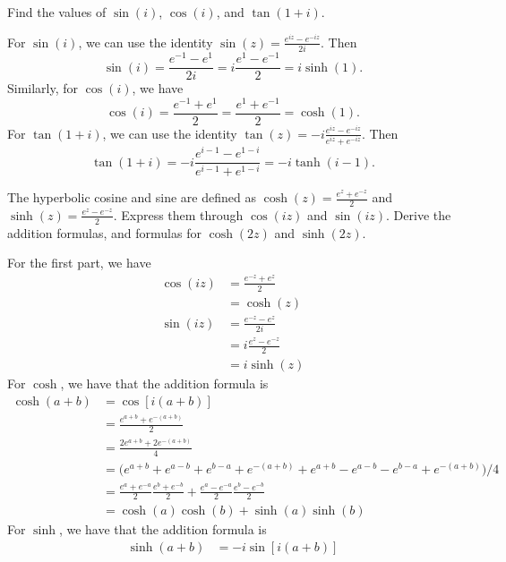 \begin{exercise}
\item
  Find the values of \(\sin(i)\), \(\cos(i)\), and \(\tan(1 + i)\).
  \par\smallskip
  For \(\sin(i)\), we can use the identity
  \(\sin(z) = \frac{e^{iz} - e^{-iz}}{2i}\).
  Then
  \[
  \sin(i) = \frac{e^{-1} - e^{1}}{2i} = i\frac{e^{1} - e^{-1}}{2} = i\sinh(1).
  \]
  Similarly, for \(\cos(i)\), we have
  \[
  \cos(i) = \frac{e^{-1} + e^{1}}{2} = \frac{e^{1} + e^{-1}}{2} = \cosh(1).
  \]
  For \(\tan(1 + i)\), we can use the identity
  \(\tan(z) = -i\frac{e^{iz} - e^{-iz}}{e^{iz} + e^{-iz}}\).
  Then
  \[
  \tan(1 + i) = -i\frac{e^{i - 1} - e^{1 - i}}{e^{i - 1} + e^{1 - i}} =
  -i\tanh(i - 1).
  \]
\item
  The hyperbolic cosine and sine are defined as
  \(\cosh(z) = \frac{e^z + e^{-z}}{2}\) and
  \(\sinh(z) = \frac{e^z - e^{-z}}{2}\).
  Express them through \(\cos(iz)\) and \(\sin(iz)\).
  Derive the addition formulas, and formulas for \(\cosh(2z)\) and
  \(\sinh(2z)\).
  \par\smallskip
  For the first part, we have
  \begin{align*}
    \cos(iz) & = \frac{e^{-z} + e^z}{2}\\
             & = \cosh(z)\\
    \sin(iz) & = \frac{e^{-z} - e^z}{2i}\\
             & = i\frac{e^z - e^{-z}}{2}\\
             & = i\sinh(z)
  \end{align*}
  For \(\cosh\), we have that the addition formula is
  \begin{align*}
    \cosh(a + b) & = \cos[i(a + b)]\\
                 & = \frac{e^{a + b} + e^{-(a + b)}}{2}\\
                 & = \frac{2e^{a + b} + 2e^{-(a + b)}}{4}\\
                 & = \bigl(e^{a + b} + e^{a - b} + e^{b - a} + e ^{-(a + b)} +
                   e^{a + b} - e^{a - b} - e^{b - a} + e^{-(a + b)}\bigr)/4\\
                 & = \frac{e^a + e^{-a}}{2}\frac{e^b + e^{-b}}{2} +
                   \frac{e^a - e^{-a}}{2}\frac{e^b - e^{-b}}{2}\\
                 & = \cosh(a)\cosh(b) + \sinh(a)\sinh(b)
  \end{align*}
  For \(\sinh\), we have that the addition formula is
  \begin{align*}
    \sinh(a + b) & = -i\sin[i(a + b)]\\

\end{align*}
\end{exercise}
